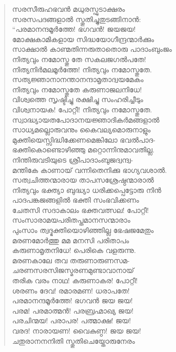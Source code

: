 \begin{verse}
സരസീരുഹഭവന്‍ മധുരസ്ഫുടാക്ഷരം\\
സരസപദങ്ങളാല്‍ സ്തുതിച്ചുതുടങ്ങിനാന്‍:\\
“പരമാനന്ദമൂര്‍ത്തേ! ഭഗവന്‍! ജയജയ!\\
മോക്ഷകാമികളായ സിദ്ധയോഗീന്ദ്രന്മാര്‍ക്കും\\
സാക്ഷാല്‍ കാണ്മതിന്നരുതാതൊരു പാദാംബുംജം\\
നിത്യവും നമോസ്തു തേ സകലജഗല്‍പതേ!\\
നിത്യനിര്‍മലമൂര്‍ത്തേ! നിത്യവും നമോസ്തുതേ.\\
സത്യജ്ഞാനാനന്താനന്ദാമൃതാദ്വയമേകം\\
നിത്യവും നമോസ്തുതേ കരുണാജലനിധേ!\\
വിശ്വത്തെ സൃഷ്ടിച്ചു രക്ഷിച്ചു സംഹരിച്ചീടും\\
വിശ്വനായക! പോറ്റീ! നിത്യവും നമോസ്തുതേ.\\
സ്വാദ്ധ്യായതപോദാനയജ്ഞാദികര്‍മങ്ങളാല്‍\\
സാധ്യമല്ലൊരുവനും കൈവല്യമൊരുനാളും\\
മുക്തിയെസ്സിദ്ധിക്കേണമെങ്കിലോ ഭവല്‍പാദ-\\
ഭക്തികൊണ്ടൊഴിഞ്ഞു മറ്റൊന്നിനുമാവതില്ല.\\
നിന്തിരുവടിയുടെ ശ്രീപാദാംബുജദ്വന്ദ്വ-\\
മന്തികേ കാണായ് വന്നിതെനിക്കു ഭാഗ്യവശാല്‍.\\
സത്വചിത്തന്മാരായ താപസശ്രേഷ്ഠന്മാരാല്‍\\
നിത്യവും ഭക്ത്യാ ബുദ്ധ്യാ ധരിക്കപ്പെട്ടോരു നിന്‍\\
പാദപങ്കജങ്ങളില്‍ ഭക്തി സംഭവിക്കണം\\
ചേതസി സദാകാലം ഭക്തവത്സല! പോറ്റീ!\\
സംസാരാമയപരിതപ്തമാനസന്മാരാം\\
പുംസാം ത്വദ്ഭക്തിയൊഴിഞ്ഞില്ല ഭേഷജമേതും\\
മരണമോര്‍ത്തു മമ മനസി പരിതാപം\\
കരുണാമൃതനിധേ! പെരികെ വളരുന്നു.\\
മരണകാലേ തവ തരുണാരുണസമ-\\
ചരണസരസിജസ്മരണമുണ്ടാവാനായ്\\
തരിക വരം നാഥ! കരുണാകര! പോറ്റീ!\\
ശരണം ദേവ! രമാരമണ! ധരാപതേ!\\
പരമാനന്ദമൂര്‍ത്തേ! ഭഗവന്‍ ജയ ജയ!\\
പരമ! പരമാത്മന്‍! പരബ്രഹ്മാഖ്യ ജയ!\\
പരചിന്മയ! പരാപര! പത്മാക്ഷ! ജയ!\\
വരദ! നാരായണ! വൈകുണ്ഠ! ജയ ജയ!\\
ചതുരാനനനിതി സ്തുതിചെയ്തോരുനേരം\\

\end{verse}
